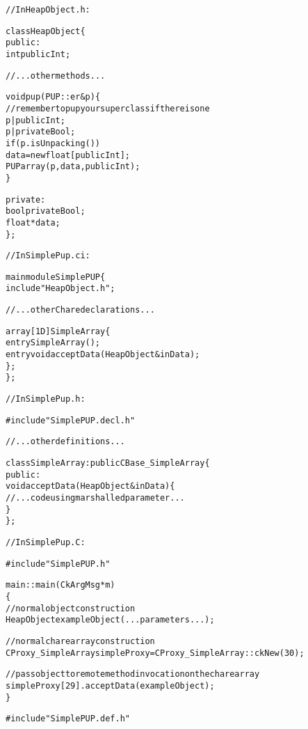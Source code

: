 \begin{alltt}
// In HeapObject.h:

class HeapObject \{
 public:
  int publicInt;

  // ... other methods ...

  void pup(PUP::er &p) \{
    // remember to pup your superclass if there is one
    p|publicInt;
    p|privateBool;
    if (p.isUnpacking())
      data = new float[publicInt];
    PUParray(p, data, publicInt);
  \}

 private:
  bool privateBool;
  float *data;
\};

// In SimplePup.ci:

mainmodule SimplePUP \{
  include "HeapObject.h";

  // ... other Chare declarations ...

  array [1D] SimpleArray\{
    entry SimpleArray();
    entry void acceptData(HeapObject &inData);
  \};
\};

// In SimplePup.h:

#include "SimplePUP.decl.h"

// ... other definitions ...

class SimpleArray : public CBase\_SimpleArray \{
 public:
  void acceptData(HeapObject &inData) \{
    // ... code using marshalled parameter ...
  \}
\};

// In SimplePup.C:

#include "SimplePUP.h"

main::main(CkArgMsg *m)
\{
  // normal object construction
  HeapObject exampleObject(... parameters ...);

  // normal chare array construction
  CProxy\_SimpleArray simpleProxy = CProxy\_SimpleArray::ckNew(30);

  // pass object to remote method invocation on the chare array
  simpleProxy[29].acceptData(exampleObject);
\}

#include "SimplePUP.def.h"
\end{alltt}
